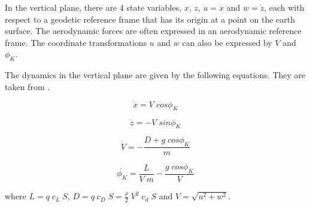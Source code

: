 In the vertical plane, there are 4 state variables, $x$, $z$, $u=\dot{x}$ and $w=\dot{z}$, each with respect to a geodetic reference frame that has its origin at a point on the earth surface. The aerodynamic forces are often expressed in an aerodynamic reference frame. The coordinate transformations $u$ and $w$ can also be expressed by $V$ and $\phi_K$.

The dynamics in the vertical plane are given by the following equations. They are taken from \cite{Fichter2009}. 

\begin{equation}
\dot{x} = V \; cos\phi_K
\end{equation}

\begin{equation}
\dot{z} = - V \; sin\phi_K
\end{equation}

\begin{equation}
\dot{V} = -\frac{D + g \; cos\phi_K}{m}
\end{equation}

\begin{equation}
\dot{\phi_K} = \frac{L}{V \; m} - \frac{g \; cos{\phi_K}}{V} 
\label{eq:dotgamma}
\end{equation}

where $L = q \; c_L \; S$, $D = q \; c_D \; S = \frac{\rho}{2} \; V^2 \; c_d \; S$ and $V=\sqrt{u^2+w^2}$.

